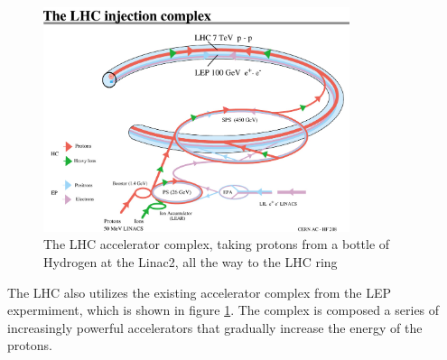 \begin{figure}[h]
   \centering
  \includegraphics[width=0.8\textwidth]{Figures/LHC_Diagrams/LHC_injection_complex.jpg}
  \caption{The LHC accelerator complex, taking protons from a bottle
    of Hydrogen at the Linac2, all the way to the LHC
    ring} \label{fig:lhc_accelerator_complex}
\end{figure}

\par The LHC also utilizes the existing accelerator complex from the
LEP expermiment, which is shown in figure
\ref{fig:lhc_accelerator_complex}.  The complex is composed a series
of increasingly powerful accelerators that gradually increase the
energy of the protons.  

